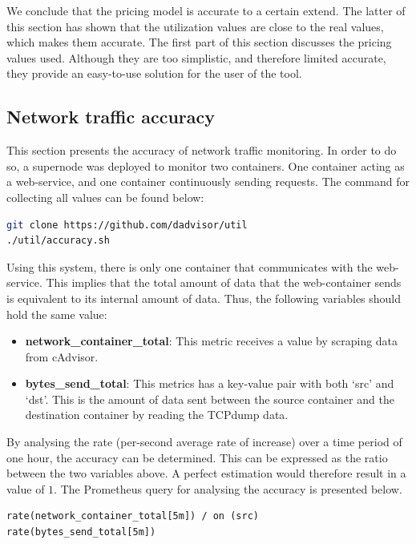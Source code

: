 \noindent 
We conclude that the pricing model is accurate to a certain extend. The latter of this section has shown that the utilization values are close to the real values, which makes them accurate. The first part of this section discusses the pricing values used. Although they are too simplistic, and therefore limited accurate, they provide an easy-to-use solution for the user of the tool.

\subsection{Network traffic accuracy} \label{sec:eval_k}
This section presents the accuracy of network traffic monitoring. In order to do so, a supernode was deployed to monitor two containers. One container acting as a web-service, and one container continuously sending requests. The command for collecting all values can be found below:

\begin{lstlisting}[language=bash, caption=Docker-compose]
git clone https://github.com/dadvisor/util
./util/accuracy.sh
\end{lstlisting}

\noindent
Using this system, there is only one container that communicates with the web-service. This implies that the total amount of data that the web-container sends is equivalent to its internal amount of data. Thus, the following variables should hold the same value:
\begin{itemize}
    \item \textbf{network\_container\_total}: This metric receives a value by scraping data from cAdvisor.
    \item \textbf{bytes\_send\_total}: This metrics has a key-value pair with both `src' and `dst'. This is the amount of data sent between the source container and the destination container by reading the TCPdump data.
\end{itemize}

\noindent
By analysing the rate (per-second average rate of increase) over a time period of one hour, the accuracy can be determined. This can be expressed as the ratio between the two variables above. A perfect estimation would therefore result in a value of $1$. The Prometheus query for analysing the accuracy is presented below.

\begin{verbatim}
rate(network_container_total[5m]) / on (src) 
rate(bytes_send_total[5m])
\end{verbatim}

